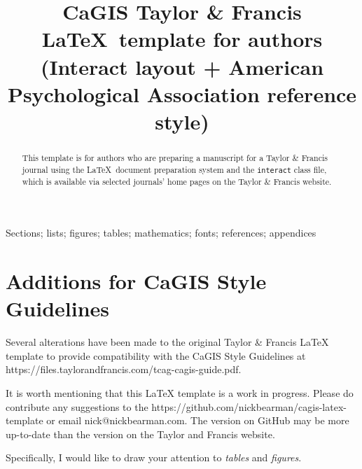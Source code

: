 \documentclass[]{interact}
\theoremstyle{plain}%
\theoremstyle{definition}
\theoremstyle{remark}
\begin{document}

\title{CaGIS Taylor \& Francis \LaTeX\ template for authors (\textsf{Interact} layout + American Psychological Association reference style)}

\author{
}

\maketitle

\begin{abstract}
This template is for authors who are preparing a manuscript for a Taylor \& Francis journal using the \LaTeX\ document preparation system and the \texttt{interact} class file, which is available via selected journals' home pages on the Taylor \& Francis website.
\end{abstract}

\begin{keywords}
Sections; lists; figures; tables; mathematics; fonts; references; appendices
\end{keywords}

\section{Additions for CaGIS Style Guidelines}

Several alterations have been made to the original Taylor \& Francis LaTeX template to provide compatibility with the CaGIS Style Guidelines at https://files.taylorandfrancis.com/tcag-cagis-guide.pdf. 

It is worth mentioning that this LaTeX template is a work in progress. Please do contribute any suggestions to the https://github.com/nickbearman/cagis-latex-template or email nick@nickbearman.com. The version on GitHub may be more up-to-date than the version on the Taylor and Francis website. 

Specifically, I would like to draw your attention to \textit{tables} and \textit{figures}.
\end{document}
